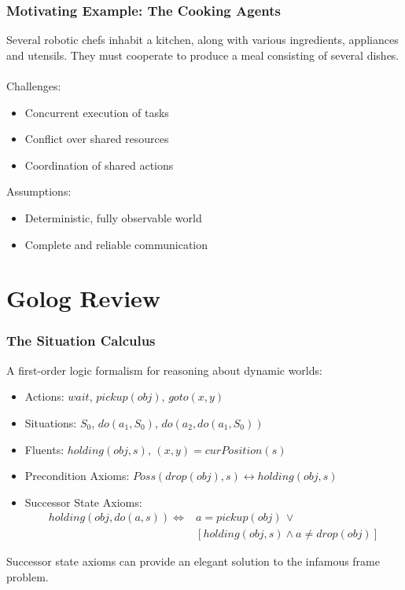 \documentclass{beamer}
\begin{document}
\begin{frame}
\frametitle{Motivating Example: The Cooking Agents}
Several robotic chefs inhabit a kitchen, along with various ingredients,
appliances and utensils.  They must cooperate to produce a meal consisting
of several dishes.\\
\ \\
Challenges:
\begin{itemize}
  \item Concurrent execution of tasks
  \item Conflict over shared resources
  \item Coordination of shared actions
\end{itemize}

Assumptions:
\begin{itemize}
  \item Deterministic, fully observable world
  \item Complete and reliable communication
\end{itemize}
\end{frame}


\section{Golog Review}

\begin{frame}
\frametitle{The Situation Calculus}

A first-order logic formalism for reasoning about dynamic worlds:

\begin{itemize}
\pause
\item Actions: $wait$, $pickup(obj)$, $goto(x,y)$
\pause
\item Situations: $S_{0}$, $do(a_{1},S_{0})$, $do(a_{2},do(a_{1},S_{0}))$
\pause
\item Fluents: $holding(obj,s)$, $(x,y)=curPosition(s)$
\pause
\item Precondition Axioms: $Poss(drop(obj),s) \leftrightarrow holding(obj,s)$
\pause
\item Successor State Axioms:\[
\begin{array}{cc}
holding(obj,do(a,s))\iff & a=pickup(obj)\,\vee\\
 & \left[holding(obj,s)\wedge a\neq drop(obj)\right]\end{array}\]
\end{itemize}
\pause
Successor state axioms can provide an elegant solution to the infamous
frame problem.

\end{frame}
\end{document}
